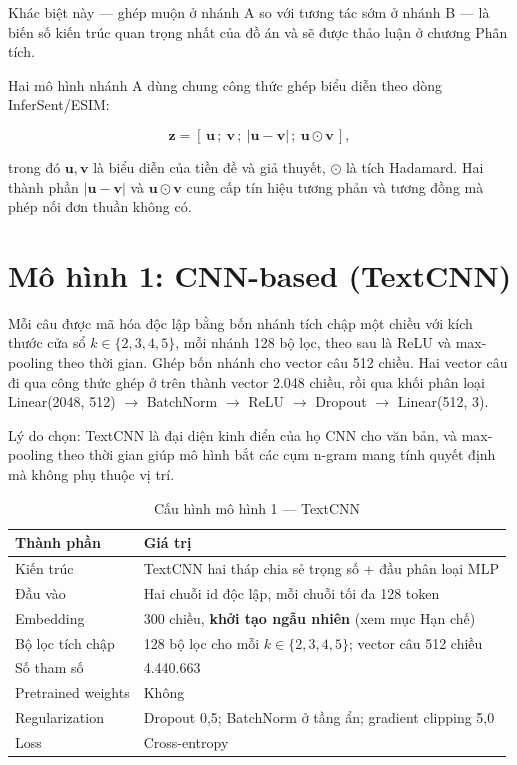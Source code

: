 \documentclass[12pt,a4paper,oneside]{report}
\begin{document}
Khác biệt này --- ghép muộn ở nhánh A so với tương tác sớm ở nhánh B --- là biến số kiến
trúc quan trọng nhất của đồ án và sẽ được thảo luận ở chương Phân tích.

Hai mô hình nhánh A dùng chung công thức ghép biểu diễn theo dòng InferSent/ESIM:

\begin{equation}
  \mathbf{z} = [\,\mathbf{u}\,;\ \mathbf{v}\,;\ |\mathbf{u}-\mathbf{v}|\,;\
  \mathbf{u}\odot\mathbf{v}\,],
\end{equation}

trong đó $\mathbf{u}, \mathbf{v}$ là biểu diễn của tiền đề và giả thuyết, $\odot$ là tích
Hadamard. Hai thành phần $|\mathbf{u}-\mathbf{v}|$ và $\mathbf{u}\odot\mathbf{v}$ cung cấp
tín hiệu tương phản và tương đồng mà phép nối đơn thuần không có.

\section{Mô hình 1: CNN-based (TextCNN)}

Mỗi câu được mã hóa độc lập bằng bốn nhánh tích chập một chiều với kích thước cửa sổ
$k \in \{2,3,4,5\}$, mỗi nhánh 128 bộ lọc, theo sau là ReLU và max-pooling theo thời gian.
Ghép bốn nhánh cho vector câu 512 chiều. Hai vector câu đi qua công thức ghép ở trên thành
vector 2.048 chiều, rồi qua khối phân loại Linear(2048, 512) $\rightarrow$ BatchNorm
$\rightarrow$ ReLU $\rightarrow$ Dropout $\rightarrow$ Linear(512, 3).

Lý do chọn: TextCNN là đại diện kinh điển của họ CNN cho văn bản, và max-pooling theo thời
gian giúp mô hình bắt các cụm n-gram mang tính quyết định mà không phụ thuộc vị trí.

\begin{table}[H]
\centering
\caption{Cấu hình mô hình 1 --- TextCNN}
\begin{tabularx}{\textwidth}{@{}L{4.5cm}Y@{}}
\toprule
\textbf{Thành phần} & \textbf{Giá trị} \\
\midrule
Kiến trúc & TextCNN hai tháp chia sẻ trọng số + đầu phân loại MLP \\
Đầu vào & Hai chuỗi id độc lập, mỗi chuỗi tối đa 128 token \\
Embedding & 300 chiều, \textbf{khởi tạo ngẫu nhiên} (xem mục Hạn chế) \\
Bộ lọc tích chập & 128 bộ lọc cho mỗi $k \in \{2,3,4,5\}$; vector câu 512 chiều \\
Số tham số & 4.440.663 \\
Pretrained weights & Không \\
Regularization & Dropout 0,5; BatchNorm ở tầng ẩn; gradient clipping 5,0 \\
Loss & Cross-entropy \\
\bottomrule
\end{tabularx}
\end{table}
\end{document}
